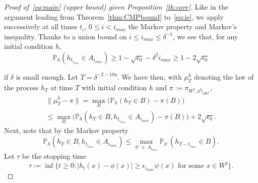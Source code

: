 \documentclass[AHL,Unicode,longabstracts,published]{cedram}
\renewcommand{\P}{\mathbb{P}}
\renewcommand{\d}{{\sharp }}
\begin{document}
\begin{proof}[Proof of~\eqref{eq:main} (upper bound) given Proposition~\ref{th:core}]
Like in the argument leading from Theorem~\ref{thm:CMPbound} to~\eqref{eq:ie}, we apply successively at all times $t_i$, $ 0 \leq i < i_{max}$ the Markov property and Markov's inequality. Thanks to a union bound on $i\le i_{max}\le \delta^{-1}$, we see that, for any initial condition $h$,
\begin{equation}
\P_h(h_{t_{i_{max}}} \in A_{i_{max}}) \geq 1 - \sqrt{\epsilon_0} - \delta^2 i_{max}\geq 1 - 2 \sqrt{\epsilon_0}
\end{equation}

if $\delta$ is small enough. Let $T=\delta^{-2-10\eta}$. We have then, with $\mu_T^h$ denoting the law of the process $h_T$ at time $T$ with initial condition $h$ and $\pi:=\pi_{W^\d,\phi^\d|_{\partial W^\d}}$,
\begin{multline}
\|\mu_T^h-\pi\|= \max_B\Big(\P_h(h_T\in B)-\pi(B)\Big)\\\le \max_B\Big(\P_h\left(h_T\in B, h_{t_{i_{max}}} \in A_{i_{max}}\right)-\pi(B)\Big)+2 \sqrt{\epsilon_0}.
\end{multline}
Next, note that by the Markov property
\begin{equation}
\P_h\left(h_T\in B, h_{t_{i_{max}}} \in A_{i_{max}}\right)\le \max_{h'\,\in\,A_{i_{max}}}\P_{h'}\left(h_{T-t_{i_{max}}}\in B\right).
\end{equation}
Let $\tau$ be the stopping time
\begin{equation}\label{eq:tau}
\tau:=\inf\big\{t\ge0:|h_t(x)-\phi(x)|\geq \epsilon_{i_{max}}\psi(x) \text{ for some } x\in W^\d\big\}.
\end{equation}


\end{proof}
\end{document}
